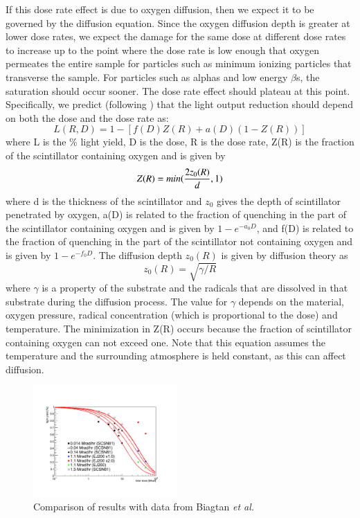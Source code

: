 \documentclass[review]{elsarticle}
\begin{document}
If this dose rate effect is due to oxygen diffusion, then
we expect it to be governed by the diffusion equation.  Since
the oxygen diffusion depth is greater at lower dose rates,
we expect the damage for the same dose at different dose rates to
increase up to the point where the dose rate is low enough that oxygen
permeates the entire sample for particles such as minimum ionizing
particles that transverse the sample.  For particles such as alphas
and low energy $\beta$s, the saturation should occur sooner.
The dose rate effect should plateau
at this point.  Specifically, we predict (following \cite{Wick1991472}) that the light output
reduction should depend on both the dose and the dose rate as:
$$ L(R,D) = 1 - [f(D)Z(R) + a(D)(1-Z(R))]$$
where L is the \% light yield, D is the dose, R is the dose rate, 
Z(R) is the fraction of the scintillator containing 
oxygen and is given by
$$Z(R)=min({{2 z_0(R)}\over{d}},1)$$
where d is the thickness of the scintillator and $z_0$ gives
the depth of scintillator penetrated by oxygen,
a(D) is related to the fraction of quenching in the part of
the scintillator containing oxygen and is given by $1-e^{-a_0 D}$, 
and
f(D) is related to the fraction of quenching in the part of
the scintillator not containing oxygen and is given by $1-e^{-f_0 D}$.
The diffusion depth $z_0(R)$ is given by diffusion theory as
$$z_0(R)=\sqrt{\gamma/R}$$
where $\gamma$ is a property of the substrate and the radicals that
are dissolved in that substrate during the diffusion process.
The value for $\gamma$ depends on the material, oxygen pressure,
radical concentration (which is proportional to the dose) and 
temperature.
The minimization in Z(R) occurs because the fraction of scintillator
containing oxygen can not exceed one.  Note that this equation 
assumes the temperature and the surrounding atmosphere
is held constant, as this can 
affect diffusion.



\begin{figure}[!ht]
\begin{center}
\includegraphics[width=0.49\textwidth]{./figures/Biagtan.pdf}
\caption{
Comparison of results with data from Biagtan {\it et al.}~\cite{Biagtan1996125}
}
\label{fig:ej200doping1x}
\end{center}
\end{figure}
\end{document}
